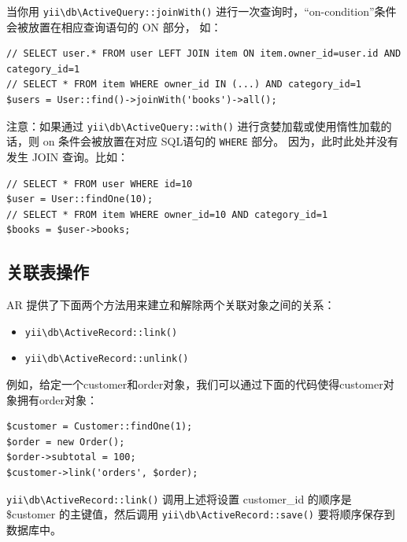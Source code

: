 当你用 \texttt{yii{\allowbreak{}\textbackslash}db{\allowbreak{}\textbackslash}ActiveQuery\allowbreak{}::\allowbreak{}joinWith()} 进行一次查询时，“on-condition”条件会被放置在相应查询语句的 ON 部分，
如：

\lstset{language=php}\begin{lstlisting}
// SELECT user.* FROM user LEFT JOIN item ON item.owner_id=user.id AND category_id=1
// SELECT * FROM item WHERE owner_id IN (...) AND category_id=1
$users = User::find()->joinWith('books')->all();
\end{lstlisting}
注意：如果通过 \texttt{yii{\allowbreak{}\textbackslash}db{\allowbreak{}\textbackslash}ActiveQuery\allowbreak{}::\allowbreak{}with()} 进行贪婪加载或使用惰性加载的话，则 on 条件会被放置在对应 SQL语句的 \lstinline|WHERE| 部分。
因为，此时此处并没有发生 JOIN 查询。比如：

\lstset{language=php}\begin{lstlisting}
// SELECT * FROM user WHERE id=10
$user = User::findOne(10);
// SELECT * FROM item WHERE owner_id=10 AND category_id=1
$books = $user->books;
\end{lstlisting}
\subsection{关联表操作}
AR 提供了下面两个方法用来建立和解除两个关联对象之间的关系：

\begin{itemize}
\item \texttt{yii{\allowbreak{}\textbackslash}db{\allowbreak{}\textbackslash}ActiveRecord\allowbreak{}::\allowbreak{}link()}
\item \texttt{yii{\allowbreak{}\textbackslash}db{\allowbreak{}\textbackslash}ActiveRecord\allowbreak{}::\allowbreak{}unlink()}
\end{itemize}
例如，给定一个customer和order对象，我们可以通过下面的代码使得customer对象拥有order对象：

\lstset{language=php}\begin{lstlisting}
$customer = Customer::findOne(1);
$order = new Order();
$order->subtotal = 100;
$customer->link('orders', $order);
\end{lstlisting}
\texttt{yii{\allowbreak{}\textbackslash}db{\allowbreak{}\textbackslash}ActiveRecord\allowbreak{}::\allowbreak{}link()} 调用上述将设置 customer\_id 的顺序是 \$customer 的主键值，然后调用 \texttt{yii{\allowbreak{}\textbackslash}db{\allowbreak{}\textbackslash}ActiveRecord\allowbreak{}::\allowbreak{}save()} 要将顺序保存到数据库中。

